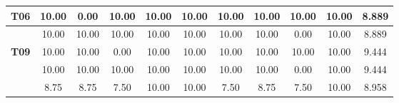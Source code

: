 \begin{table}[htbp]
\begin{tabular}{c|cccccccccc|}
		\multicolumn{1}{|c|}{\textbf{T06}} & \multicolumn{1}{c|}{10.00} & \multicolumn{1}{c|}{0.00} & \multicolumn{1}{c|}{10.00} & \multicolumn{1}{c|}{10.00} & \multicolumn{1}{c|}{10.00} & \multicolumn{1}{c|}{10.00} & \multicolumn{1}{c|}{10.00} & \multicolumn{1}{c|}{10.00} & \multicolumn{1}{c|}{10.00} & 8.889 \\ \hline
		\rowcolor[HTML]{F2F2F2} 
		\multicolumn{1}{|c|}{\cellcolor[HTML]{F2F2F2}\textbf{T08}} & \multicolumn{1}{c|}{\cellcolor[HTML]{F2F2F2}10.00} & \multicolumn{1}{c|}{\cellcolor[HTML]{F2F2F2}10.00} & \multicolumn{1}{c|}{\cellcolor[HTML]{F2F2F2}10.00} & \multicolumn{1}{c|}{\cellcolor[HTML]{F2F2F2}10.00} & \multicolumn{1}{c|}{\cellcolor[HTML]{F2F2F2}10.00} & \multicolumn{1}{c|}{\cellcolor[HTML]{F2F2F2}10.00} & \multicolumn{1}{c|}{\cellcolor[HTML]{F2F2F2}10.00} & \multicolumn{1}{c|}{\cellcolor[HTML]{F2F2F2}0.00} & \multicolumn{1}{c|}{\cellcolor[HTML]{F2F2F2}10.00} & 8.889 \\ \hline
		\multicolumn{1}{|c|}{\textbf{T09}} & \multicolumn{1}{c|}{10.00} & \multicolumn{1}{c|}{10.00} & \multicolumn{1}{c|}{0.00} & \multicolumn{1}{c|}{10.00} & \multicolumn{1}{c|}{10.00} & \multicolumn{1}{c|}{10.00} & \multicolumn{1}{c|}{10.00} & \multicolumn{1}{c|}{10.00} & \multicolumn{1}{c|}{10.00} & 9.444 \\ \hline
		\rowcolor[HTML]{F2F2F2} 
		\multicolumn{1}{|c|}{\cellcolor[HTML]{F2F2F2}\textbf{T10}} & \multicolumn{1}{c|}{\cellcolor[HTML]{F2F2F2}10.00} & \multicolumn{1}{c|}{\cellcolor[HTML]{F2F2F2}10.00} & \multicolumn{1}{c|}{\cellcolor[HTML]{F2F2F2}10.00} & \multicolumn{1}{c|}{\cellcolor[HTML]{F2F2F2}10.00} & \multicolumn{1}{c|}{\cellcolor[HTML]{F2F2F2}10.00} & \multicolumn{1}{c|}{\cellcolor[HTML]{F2F2F2}10.00} & \multicolumn{1}{c|}{\cellcolor[HTML]{F2F2F2}10.00} & \multicolumn{1}{c|}{\cellcolor[HTML]{F2F2F2}0.00} & \multicolumn{1}{c|}{\cellcolor[HTML]{F2F2F2}10.00} & 9.444 \\ \hline
		\rowcolor[HTML]{D0CECE} 
		\multicolumn{1}{|c|}{\cellcolor[HTML]{D0CECE}\textbf{Média}} & \multicolumn{1}{c|}{\cellcolor[HTML]{D0CECE}8.75} & \multicolumn{1}{c|}{\cellcolor[HTML]{D0CECE}8.75} & \multicolumn{1}{c|}{\cellcolor[HTML]{D0CECE}7.50} & \multicolumn{1}{c|}{\cellcolor[HTML]{D0CECE}10.00} & \multicolumn{1}{c|}{\cellcolor[HTML]{D0CECE}10.00} & \multicolumn{1}{c|}{\cellcolor[HTML]{D0CECE}7.50} & \multicolumn{1}{c|}{\cellcolor[HTML]{D0CECE}8.75} & \multicolumn{1}{c|}{\cellcolor[HTML]{D0CECE}7.50} & \multicolumn{1}{c|}{\cellcolor[HTML]{D0CECE}10.00} & 8.958 \\ \hline
	\end{tabular}
	\label{tab:F3_A2_NT_CASO_BINARIO_}
\end{table}

